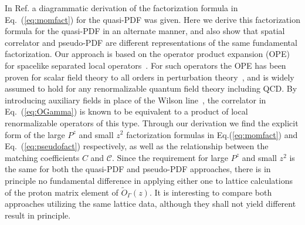 \documentclass[prd,aps,twocolumn,preprintnumbers,showpacs,nofootinbib,superscriptaddress,notitlepage]{revtex4-1}
\newcommand{\spcorr}{spatial correlator\xspace}
\DeclareRobustCommand{\eq}[1]{Eq.~(\ref{eq:#1})}
\begin{document}
In Ref.\cite{Ma:2014jla} a diagrammatic derivation of the factorization formula in \eq{momfact} for the quasi-PDF was given.  Here we derive this factorization formula for the quasi-PDF in an alternate manner, and also show that \spcorr and pseudo-PDF are different representations of the same
fundamental factorization. Our approach is based on the operator product expansion (OPE) for spacelike separated local operators~\cite{Wilson:1969zs}. For such operators the OPE has been proven for scalar field theory to all orders in perturbation theory~\cite{Brandt:1967rb,Wilson:1972ee,Zimmermann:1972tv}, and is widely assumed to hold for any renormalizable quantum field theory including QCD. By introducing auxiliary fields in place of the Wilson line~\cite{Dorn:1986dt}, the correlator in \eq{OGamma} is known to be equivalent to a product of local renormalizable operators of this type. Through our derivation we find the explicit form of the large $P^z$ and small $z^2$ factorization formulas in Eq.(\ref{eq:momfact}) and Eq.~(\ref{eq:pseudofact}) respectively, as well as the relationship between the matching coefficients $C$ and $\mathcal{C}$. Since the requirement for large $P^z$ and small $z^2$ is the same for both the quasi-PDF and pseudo-PDF approaches, there is in principle no fundamental difference in applying either one
to lattice calculations of the proton matrix element of $\tilde{O}_{\Gamma}(z)$. It is interesting to compare
both approaches utilizing the same lattice data, although they shall not yield different result in principle.
\end{document}

